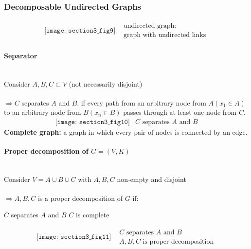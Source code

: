 
\subsubsection{Decomposable Undirected Graphs}
\[\begin{array}{ll}
	\texttt{[image: section3\_fig9]}
	& \substack{\text{undirected graph:} \\ 
		\text{graph with undirected links}}
\end{array} \]
\paragraph{Separator}\mbox{}\\
Consider $A, B, C \subset V$ (not necessarily disjoint)\\\\
$\Rightarrow C$ separates $A$ and $B$, if every path from an arbitrary node from $A (x_1 \in A)$ to an arbitrary node from $B (x_n \in B)$ passes through at least one node from $C$.
\[ \begin{array}{ll}
	\texttt{[image: section3\_fig10]}
	& C \text{ separates } A \text{ and } B
      \end{array} \]
\textbf{Complete graph:} a graph in which every pair of nodes is connected by an edge.

\paragraph{Proper decomposition of $G = (V,K)$}\mbox{}\\
Consider $V = A \cup B \cup C$ with $A,B,C$ non-empty and disjoint
\\\\
$\Rightarrow A,B,C$ is a proper decomposition of $G$ if:
\begin{itemize}
	\itl $C$ separates $A$ and $B$
	\itl $C$ is complete 
\end{itemize}
\[ \begin{array}{ll}
	\texttt{[image: section3\_fig11]}
	& \substack{C \text{ separates } A \text{ and } B\\
		A,B,C \text{ is proper decomposition}}
\end{array} \]
